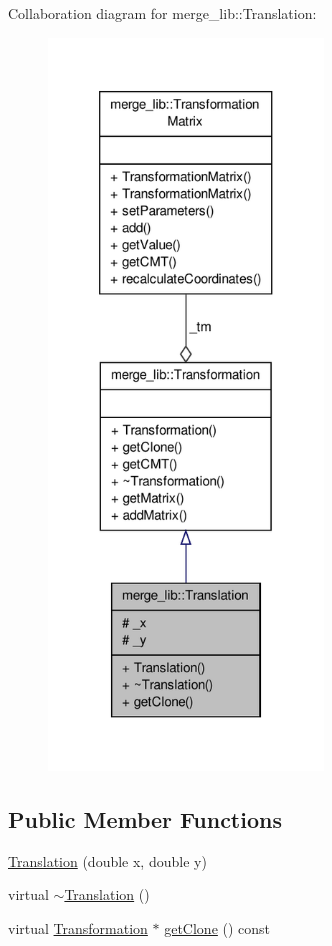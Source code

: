 Collaboration diagram for merge\-\_\-lib\-:\-:Translation\-:
\nopagebreak
\begin{figure}[H]
\begin{center}
\leavevmode
\includegraphics[height=550pt]{d8/dc7/classmerge__lib_1_1_translation__coll__graph}
\end{center}
\end{figure}
\subsection*{Public Member Functions}
\begin{DoxyCompactItemize}
\item 
\hyperlink{classmerge__lib_1_1_translation_a110728e034b46c580bb5648a7f168832}{Translation} (double x, double y)
\item 
virtual \hyperlink{classmerge__lib_1_1_translation_a11ec528983f28f5ea0f4cca1b798134f}{$\sim$\-Translation} ()
\item 
virtual \hyperlink{classmerge__lib_1_1_transformation}{Transformation} $\ast$ \hyperlink{classmerge__lib_1_1_translation_a2639b37271bc3b34f3f3179049c620c6}{get\-Clone} () const 
\end{DoxyCompactItemize}
